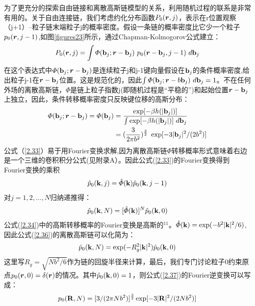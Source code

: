 为了更充分的探索自由链接和离散高斯链模型的关系，利用随机过程的联系是非常有用的。关于自由连接链，我们考虑约化分布函数$P_{0}(\bm{r},j)$，表示在r位置观察（j+1）--粒子链末端粒子j的概率密度。假设一条链的概率密度比它少一个粒子$p_{0}(\bm{r},j-1)$,如图\ref{figures23}所示，通过Chapman-Kolmogorov公式建立：
\begin{equation}\label{2.33}
P_{0}(\bm{r},j)=\int  \varPhi (\mathbf{b}_{j};\bm{r}-\mathbf{b}_{j})~p_{0}(\bm{r}-\mathbf{b}_{j},j-1)~d\mathbf{b}_{j}
\end{equation}
在这个表达式中$\varPhi (\mathbf{b}_{j};\bm{r}-\mathbf{b}_{j})$是连续粒子j和j-1键向量假设在$\mathbf{b}_{j}$的条件概率密度,给出粒子j-1在$\bm{r}-\mathbf{b}_{j}$位置。这是规范化的，因此$\int  \varPhi (\mathbf{b}_{j};\bm{r}-b\mathbf{b}_{j})~d\mathbf{b}_{j}=1$。不在任何外场的离散高斯链，$\varPhi$是链上粒子指数j(即随机过程是“平稳的”)和起始位置$\bm{r}-\mathbf{b}_{j}$上独立，因此，条件转移概率密度只反映键位移的高斯分布：
\begin{equation}\label{2.34}
\begin{aligned}
\varPhi(\mathbf{b}_{j};\bm{r}-\mathbf{b}_{j})=\varPhi(\mathbf{b}_{j})&=\frac{\exp[-\beta h(|\mathbf{b}_{j}|)]}{\int \exp[-\beta h(|\mathbf{b}_{j}|)]~d\mathbf{b}_{j}} \\ &=(\frac{3}{2 \pi b^2})^{\frac{3}{2}}~\exp[-3|\mathbf{b}_{j}|^2 / (2b^2)]
\end{aligned}
\end{equation}
公式（\ref{2.33}）易于用Fourier变换求解,因为离散高斯链$\varPhi$转移概率形式意味着右边是一个三维的卷积积分公式(见附录A）。因此公式(\ref{2.33})的Fourier变换得到Fourier变换的乘积
\begin{equation}\label{2.35}
\hat{p}_{0}(\mathbf{k},j)=\hat{\varPhi}(\mathbf{k})\hat{p}_{0}(\mathbf{k},j-1)
\end{equation}
对$j=1,2,\dots ,N$归纳递推得：
\begin{equation}\label{2.36}
\hat{p}_{0}(\mathbf{k},N)=[\hat{\varPhi}(\mathbf{k})]^N\hat{p}_{0}(\mathbf{k},0)
\end{equation}
公式(\ref{2.34})中的高斯转移概率的Fourier变换是高斯的$^{11}$。$\hat{\varPhi}(\mathbf{k})=\exp(-b^2|\mathbf{k}|^2/6)$,因此公式(\ref{2.36})的离散高斯链可以化简为：
\begin{equation}\label{2.37}
\hat{p}_{0}(\mathbf{k},N)=\exp(-R_{g}^2|\mathbf{k}|^2)\hat{p}_{0}(\mathbf{k},0)
\end{equation}
这里写$R_{g}=\sqrt{Nb^2/6}$作为链的回旋半径来计算，最后，我们专门讨论粒子0约束原点$p_{0}(\bm{r},0)=\delta(\bm{r})$的情况。其中$\hat{p}_{0}(\mathbf{k},0)=1$，则公式(\ref{2.37})的Fourier逆变换可以写成：
\begin{equation}\label{2.38}
p_{0}(\mathbf{R},N)=[3/(2\pi Nb^2)]^\frac{3}{2}\exp[-3|\mathbf{R}|^2/(2Nb^2)]
\end{equation}

